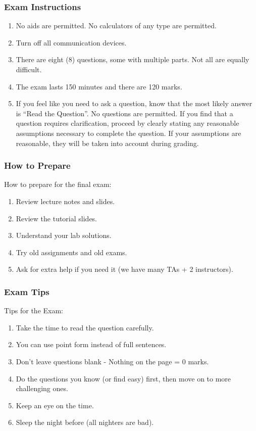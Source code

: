 \begin{frame}
\frametitle{Exam Instructions}

\begin{enumerate}
	\item No aids are permitted. No calculators of any type are permitted.
	\item Turn off all communication devices.
	\item There are eight (8) questions, some with multiple parts. Not all are equally difficult.
	\item The exam lasts 150 minutes and there are 120 marks.
	\item If you feel like you need to ask a question, know that the most likely answer is ``Read the Question''. No questions are permitted. If you find that a question requires clarification, proceed by clearly stating any reasonable assumptions necessary to complete the question. If your assumptions are reasonable, they will be taken into account during grading.  
\end{enumerate}

\end{frame}



\begin{frame}
\frametitle{How to Prepare}

How to prepare for the final exam:

\begin{enumerate}
	\item Review lecture notes and slides.
	\item Review the tutorial slides.
	\item Understand your lab solutions.
	\item Try old assignments and old exams.
	\item Ask for extra help if you need it (we have many TAs + 2 instructors).
\end{enumerate}

\end{frame}

\begin{frame}
\frametitle{Exam Tips}

Tips for the Exam:

\begin{enumerate}
	\item Take the time to read the question carefully.
	\item You can use point form instead of full sentences.
	\item Don't leave questions blank - Nothing on the page = 0 marks.
	\item Do the questions you know (or find easy) first, then move on to more challenging ones.
	\item Keep an eye on the time.
	\item Sleep the night before (all nighters are bad).
	
\end{enumerate}

\end{frame}


